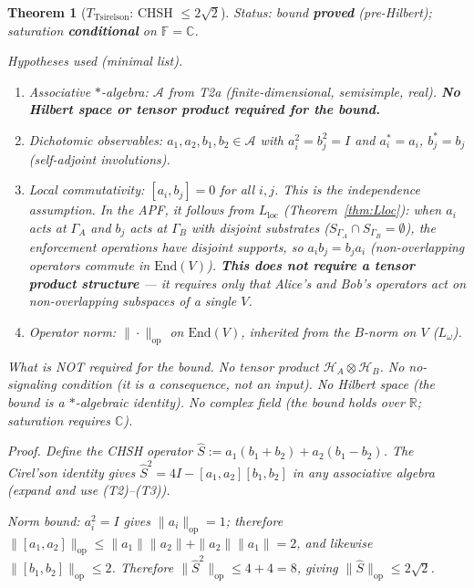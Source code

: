 \documentclass[11pt,a4paper]{article}
\newtheorem{theorem}{Theorem}[section]
\theoremstyle{definition}
\newcommand{\End}{\mathrm{End}}
\newcommand{\op}{\mathrm{op}}
\begin{document}
\begin{theorem}[$T_{\mathrm{Tsirelson}}$: CHSH $\le 2\sqrt{2}$]\label{thm:Tsirelson}
\textit{Status: bound \textbf{proved} (pre-Hilbert); saturation \textbf{conditional} on $\mathbb{F} = \mathbb{C}$.}

\smallskip\noindent\textit{Hypotheses used (minimal list).}
\begin{enumerate}[nosep,label=(T\arabic*),leftmargin=2.5em]
\item \textit{Associative $*$-algebra:} $\mathcal{A}$ from T2a (finite-dimensional, semisimple, real).  \textbf{No Hilbert space or tensor product required for the bound.}
\item \textit{Dichotomic observables:} $a_1, a_2, b_1, b_2 \in \mathcal{A}$ with $a_i^2 = b_j^2 = I$ and $a_i^* = a_i$, $b_j^* = b_j$ (self-adjoint involutions).
\item \textit{Local commutativity:} $[a_i, b_j] = 0$ for all $i, j$.  This is the independence assumption.  In the APF, it follows from $L_{\mathrm{loc}}$ (Theorem~\ref{thm:Lloc}): when $a_i$ acts at $\Gamma_A$ and $b_j$ acts at $\Gamma_B$ with disjoint substrates ($S_{\Gamma_A} \cap S_{\Gamma_B} = \emptyset$), the enforcement operations have disjoint supports, so $a_i b_j = b_j a_i$ (non-overlapping operators commute in $\End(V)$).  \textbf{This does not require a tensor product structure} --- it requires only that Alice's and Bob's operators act on non-overlapping subspaces of a single $V$.
\item \textit{Operator norm:} $\|\cdot\|_{\mathrm{op}}$ on $\End(V)$, inherited from the $B$-norm on $V$ ($L_\omega$).
\end{enumerate}

\smallskip\noindent\textit{What is NOT required for the bound.}  No tensor product $\mathcal{H}_A \otimes \mathcal{H}_B$.  No no-signaling condition (it is a consequence, not an input).  No Hilbert space (the bound is a $*$-algebraic identity).  No complex field (the bound holds over $\mathbb{R}$; saturation requires $\mathbb{C}$).

\smallskip\noindent\textit{Proof.}  Define the CHSH operator $\hat{S} := a_1(b_1 + b_2) + a_2(b_1 - b_2)$.  The Cirel'son identity gives $\hat{S}^2 = 4I - [a_1,a_2][b_1,b_2]$ in any associative algebra (expand and use (T2)--(T3)).  

\textit{Norm bound:}  $a_i^2 = I$ gives $\|a_i\|_{\op} = 1$; therefore $\|[a_1,a_2]\|_{\op} \le \|a_1\|\|a_2\| + \|a_2\|\|a_1\| = 2$, and likewise $\|[b_1,b_2]\|_{\op} \le 2$.  Therefore $\|\hat{S}^2\|_{\op} \le 4 + 4 = 8$, giving $\|\hat{S}\|_{\op} \le 2\sqrt{2}$.


\end{theorem}
\end{document}
